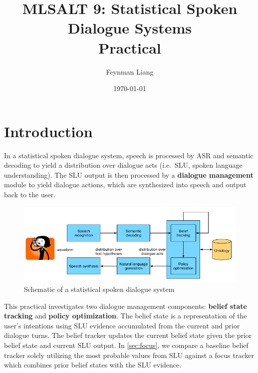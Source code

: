 \documentclass[a4paper,oneside,reqno]{amsart}
\newcommand{\authorname}{Feynman Liang}
\newcommand{\coursename}{MLSALT 9: Statistical Spoken Dialogue Systems}
\newcommand{\assignmentname}{Practical}
\begin{document}
%

\title{\coursename\\\assignmentname}

\author{\authorname}
\date{\today}

\maketitle

\section{Introduction}

In a statistical spoken dialogue system, speech is processed by ASR and
semantic decoding to yield a distribution over dialogue acts (i.e.\
SLU, spoken language understanding). The SLU output is then processed by a
\textbf{dialogue management} module to yield dialogue actions, which are synthesized
into speech and output back to the user.

\begin{figure}[ht]
  \begin{center}
    \includegraphics[scale=.5]{Figures/ds-diagram.png}
  \end{center}
  \caption{Schematic of a statistical spoken dialogue system\cite{lect3}}
  \label{fig:schematic}
\end{figure}

This practical investigates two dialogue management components: \textbf{belief
state tracking} and \textbf{policy optimization}. The belief state is a
representation of the user's intentions using SLU evidence accumulated from the
current and prior dialogue turns. The belief tracker updates the current belief
state given the prior belief state and current SLU output. In
\autoref{sec:focus}, we compare a baseline belief tracker solely utilizing the
most probable values from SLU against a focus tracker which combines prior
belief states with the SLU evidence.
\end{document}

